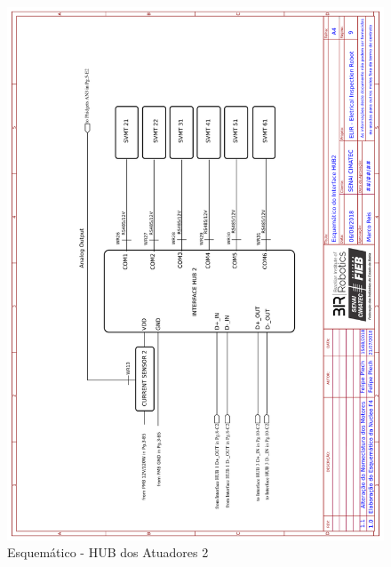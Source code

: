     \begin{figure}[H]
	\centering
	\includegraphics[width=14cm]{Figures/EsquematicoHUB2.png}
	\caption{Esquemático - HUB dos Atuadores 2} \label{HUB2}
	\end{figure}
	
	\pagebreak
	

